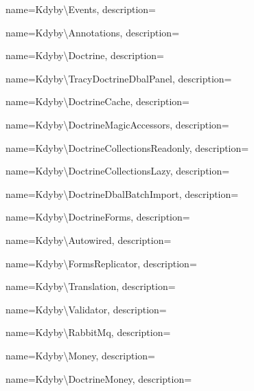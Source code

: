  {
  name={K\-dy\-by\textbackslash{}\-E\-ven\-ts},
  description={} }

 {
  name={K\-dy\-by\textbackslash{}\-Anno\-ta\-ti\-on\-s},
  description={} }

 {
  name={K\-dy\-by\textbackslash{}\-Doc\-tri\-ne},
  description={} }

 {
  name={K\-dy\-by\textbackslash{}\-Tra\-cy\-Doc\-tri\-ne\-D\-b\-a\-l\-Pa\-nel},
  description={} }

 {
  name={K\-dy\-by\textbackslash{}\-Doc\-tri\-ne\-Ca\-che},
  description={} }

 {
  name={K\-dy\-by\textbackslash{}\-Doc\-tri\-ne\-Ma\-gic\-Acces\-sor\-s},
  description={} }

 {
  name={K\-dy\-by\textbackslash{}\-Doc\-tri\-ne\-Collec\-ti\-ons\-Read\-on\-ly},
  description={} }

 {
  name={K\-dy\-by\textbackslash{}\-Doc\-tri\-ne\-Collec\-ti\-ons\-La\-zy},
  description={} }

 {
  name={K\-dy\-by\textbackslash{}\-Doc\-tri\-ne\-Dbal\-Batch\-Im\-port},
  description={} }

 {
  name={K\-dy\-by\textbackslash{}\-Doc\-tri\-ne\-Forms},
  description={} }

 {
  name={K\-dy\-by\textbackslash{}\-Auto\-wi\-red},
  description={} }

 {
  name={K\-dy\-by\textbackslash{}\-Forms\-Re\-pli\-ca\-tor},
  description={} }

 {
  name={K\-dy\-by\textbackslash{}\-Tran\-sla\-tion},
  description={} }

 {
  name={K\-dy\-by\textbackslash{}\-Va\-li\-da\-tor},
  description={} }

 {
  name={K\-dy\-by\textbackslash{}\-Ra\-bbit\-Mq},
  description={} }

 {
  name={K\-dy\-by\textbackslash{}\-Mo\-ney},
  description={} }

 {
  name={K\-dy\-by\textbackslash{}\-Doc\-tri\-ne\-Mo\-ney},
  description={} }

